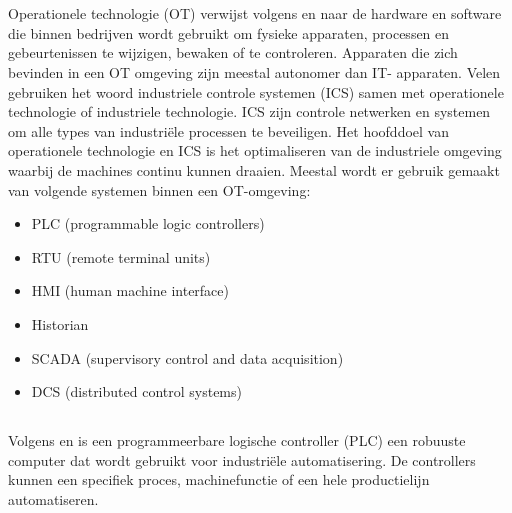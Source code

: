 \section{}
\label{sec:operationele technologie}
\subsection{}
\label{subsec:operationele technologie}
Operationele technologie (OT) verwijst volgens \textcite{VirtualArmour2020} en \textcite{Gartner} naar de hardware en software die binnen bedrijven wordt gebruikt om fysieke apparaten, processen en gebeurtenissen te wijzigen, bewaken of te controleren. Apparaten die zich bevinden in een OT omgeving zijn meestal autonomer dan IT- apparaten. Velen gebruiken het woord industriele controle systemen (ICS) samen met operationele technologie of industriele technologie. ICS zijn controle netwerken en systemen om alle types van industriële processen te beveiligen. Het hoofddoel van operationele technologie en ICS is het optimaliseren van de industriele omgeving waarbij de machines continu kunnen draaien. Meestal wordt er gebruik gemaakt van volgende systemen binnen een OT-omgeving:
\begin{itemize}
    \item PLC (programmable logic controllers)
    \item RTU (remote terminal units)
    \item HMI (human machine interface)
    \item Historian
    \item SCADA (supervisory control and data acquisition)
    \item DCS (distributed control systems)
    
    
\end{itemize}
\subsection{}
\label{subsec:OTcomponenten}
\subsubsection{}
\label{subsubsec:PLC}
Volgens \textcite{Unitronics} en \textcite{2020} is een programmeerbare logische controller (PLC) een robuuste computer dat wordt gebruikt voor industriële automatisering. De controllers kunnen een specifiek proces, machinefunctie of een hele productielijn automatiseren.

